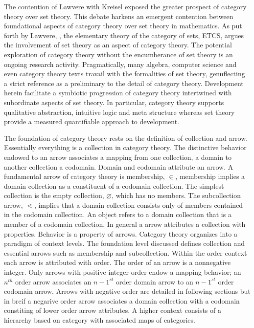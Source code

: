 \documentclass[aps,twocolumn,secnumarabic,nobalancelastpage,amsmath,amssymb,
amsthm,nofootinbib,parskip=full]{revtex4}
\numberwithin{equation}{section}
\begin{document}
The contention of Lawvere with Kreisel exposed the greater prospect of
category theory over set theory. This debate
harkens an emergent contention between foundational aspects of
category theory over set theory in mathematics.
As put forth by Lawvere, \cite{lawvere1965},
the elementary theory of the category of sets, ETCS,
argues the involvement of set theory as an aspect
of category theory. The potential exploration of
category theory without the encumberance of set
theory is an ongoing research activity.
Pragmatically, many algebra, computer science and
even category theory texts travail with the formalities of
set theory, genuflecting a strict reference
as a preliminary to the detail of category theory.
Development herein facilitate a symbiotic progression of
category theory intertwined with subordinate aspects of set theory.
In particular, category theory supports qualitative abstraction,
intuitive logic and meta structure whereas set theory provide a
measured quantifiable approach to development.

The foundation of category theory rests on the definition of
collection and arrow.
Essentially everything is a collection in category theory.
The distinctive behavior endowed to an arrow associates a mapping from one
collection, a domain to another collection a codomain.
Domain and codomain attribute an arrow. 
A fundamental arrow of category theory is membership, $\in$, membership
implies a domain collection as a constituent of a codomain collection.
The simplest collection is the empty collection, $\varnothing$,
which has no members. The subcollection arrow, $\lessdot$, implies
that a domain collection consists only of members contained in the codomain
collection. An object refers to a domain collection that is a
member of a codomain collection. In general a arrow attributes 
a collection with properties. Behavior is a property of arrows.
Category theory organizes into a paradigm of context levels.
The foundation level discussed defines collection and essential arrows such
as membership and subcollection.
Within the order context each arrow is attributed with order.
The order of an arrow is a nonnegative integer.
Only arrows with positive integer order endow a mapping behavior;
an $n^{th}$ order arrow associates an $n-1^{st}$ order domain arrow to an
$n-1^{st}$ order codomain arrow. Arrows with negative order
are detailed in following sections but in breif a negarive order arrow
associates a domain collection with a codomain constiting of
lower order arrow attributes.
A higher context consists of a hierarchy based on category with
associated maps of categories.
\end{document}
